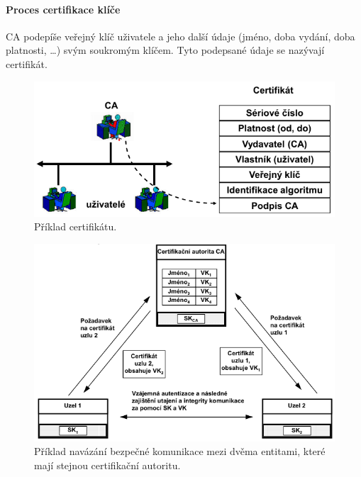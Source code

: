\paragraph*{Proces certifikace klíče} CA podepíše veřejný klíč uživatele a jeho další údaje (jméno, doba vydání, doba platnosti, \dots) svým soukromým klíčem. Tyto podepsané údaje se nazývají certifikát.

\begin{figure}[H]
    \centering
    \includegraphics[width=0.65\linewidth]{certifikat.pdf}
    \caption{Příklad certifikátu.}
\end{figure}

\begin{figure}[H]
    \centering
    \includegraphics[width=1\linewidth]{vymena_certifikatu.pdf}
    \caption{Příklad navázání bezpečné komunikace mezi dvěma entitami, které mají stejnou certifikační autoritu.}
    \label{53_vymena_certifikatu}
\end{figure}

